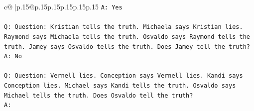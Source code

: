 \documentclass{article}
\begin{document}
{\begin{supertabular}{c@{$\;$}|p{.15\linewidth}@{}p{.15\linewidth}p{.15\linewidth}p{.15\linewidth}p{.15\linewidth}p{.15\linewidth}}
{{{\texttt{A: Yes} \\
\\ 
\texttt{Q: Question: Kristian tells the truth. Michaela says Kristian lies. Raymond says Michaela tells the truth. Osvaldo says Raymond tells the truth. Jamey says Osvaldo tells the truth. Does Jamey tell the truth?} \\
\texttt{A: No} \\
\\ 
\texttt{Q: Question: Vernell lies. Conception says Vernell lies. Kandi says Conception lies. Michael says Kandi tells the truth. Osvaldo says Michael tells the truth. Does Osvaldo tell the truth?} \\
\texttt{A:} \\
            }
        }
    }
     \\ \\


\end{supertabular}}
\end{document}
